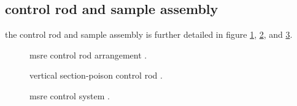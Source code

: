 \documentclass{article}
\begin{document}
\begin{preview}
\subsection{control rod and sample assembly}
the control rod and sample assembly is further detailed in figure \ref{61246-fig14a}, \ref{61246-fig14b}, and \ref{61246-fig14c}.
\begin{figure}[H]
  \centering
  \caption{msre control rod arrangement \parencite[figure 14a]{ad-cf-61-2-46}.}
  \label{61246-fig14a}
\end{figure}

\begin{figure}[H]
  \centering
  \caption{vertical section-poison control rod \parencite[figure 14b]{ad-cf-61-2-46}.}
  \label{61246-fig14b}
\end{figure}

\begin{figure}[H]
  \centering
  \caption{msre control system \parencite[figure 14c]{ad-cf-61-2-46}.}
  \label{61246-fig14c}
\end{figure}



\printbibliography

\end{preview}
\end{document}
